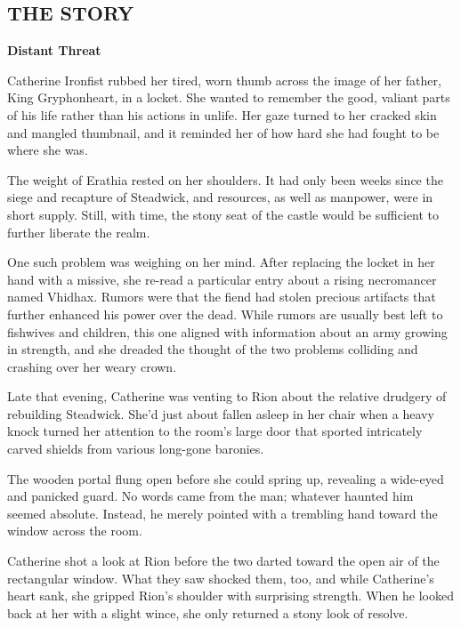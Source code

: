 \newpage

\begin{multicols*}{2}

\subsection*{\MakeUppercase{The story}}

\textbf{Distant Threat}

Catherine Ironfist rubbed her tired, worn thumb across the image of her father, King Gryphonheart, in a locket.
She wanted to remember the good, valiant parts of his life rather than his actions in unlife.
Her gaze turned to her cracked skin and mangled thumbnail, and it reminded her of how hard she had fought to be where she was.

The weight of Erathia rested on her shoulders.
It had only been weeks since the siege and recapture of Steadwick, and resources, as well as manpower, were in short supply.
Still, with time, the stony seat of the castle would be sufficient to further liberate the realm.

One such problem was weighing on her mind.
After replacing the locket in her hand with a missive, she re-read a particular entry about a rising necromancer named Vhidhax.
Rumors were that the fiend had stolen precious artifacts that further enhanced his power over the dead.
While rumors are usually best left to fishwives and children, this one aligned with information about an army growing in strength, and she dreaded the thought of the two problems colliding and crashing over her weary crown.

Late that evening, Catherine was venting to Rion about the relative drudgery of rebuilding Steadwick.
She'd just about fallen asleep in her chair when a heavy knock turned her attention to the room's large door that sported intricately carved shields from various long-gone baronies.

The wooden portal flung open before she could spring up, revealing a wide-eyed and panicked guard.
No words came from the man; whatever haunted him seemed absolute.
Instead, he merely pointed with a trembling hand toward the window across the room.

Catherine shot a look at Rion before the two darted toward the open air of the rectangular window.
What they saw shocked them, too, and while Catherine's heart sank, she gripped Rion's shoulder with surprising strength.
When he looked back at her with a slight wince, she only returned a stony look of resolve.


\end{multicols*}
